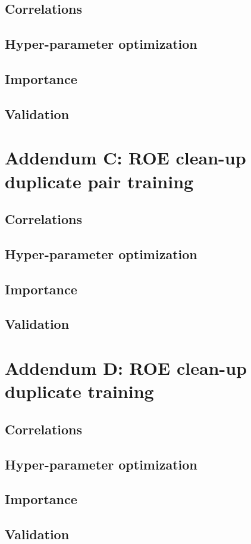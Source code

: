 \documentclass[oneside,a4paper,openany,12pt]{scrbook}
\begin{document}
\section*{Correlations}
\section*{Hyper-parameter optimization}
\section*{Importance}
\section*{Validation}

\chapter*{Addendum C: ROE clean-up duplicate pair training}
\section*{Correlations}
\section*{Hyper-parameter optimization}
\section*{Importance}
\section*{Validation}

\chapter*{Addendum D: ROE clean-up duplicate training}
\section*{Correlations}
\section*{Hyper-parameter optimization}
\section*{Importance}
\section*{Validation}
\end{document}
